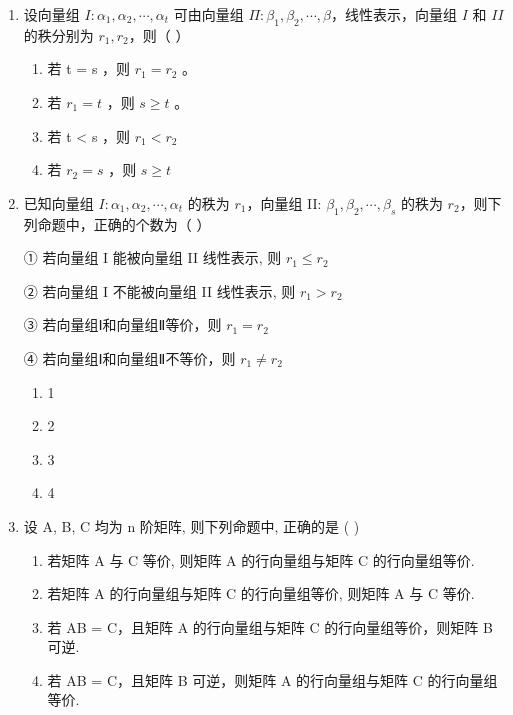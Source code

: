 \documentclass[12pt, a4paper]{ctexart}
\begin{document}
\begin{enumerate}
    \item 设向量组 $ I: \alpha_1, \alpha_2, \cdots, \alpha_t $ 可由向量组 $ \Pi: \beta_1, \beta_2, \cdots, \beta $，线性表示，向量组 $ I $ 和 $ II $ 的秩分别为 $ r_1, r_2 $，则（ \underline{\hspace{1cm}} ）
    \begin{enumerate}[label=(\Alph*)]
        \item 若 t = s ，则 $ r_{1} = r_{2} $ 。
        \item 若 $ r_{1} = t $ ，则 $ s \geq t $ 。
        \item 若 t < s ，则 $ r_{1} < r_{2} $
        \item 若 $ r_{2}=s $ ，则 $ s \geq t $
    \end{enumerate}

    \item 已知向量组 $ I: \alpha_1, \alpha_2, \cdots, \alpha_t $ 的秩为 $ r_1 $，向量组 II: $ \beta_1, \beta_2, \cdots, \beta_s $ 的秩为 $ r_2 $，则下列命题中，正确的个数为（ \underline{\hspace{1cm}} ）
    
    ① 若向量组 I 能被向量组 II 线性表示, 则 $ r_{1} \leq r_{2} $
    
    ② 若向量组 I 不能被向量组 II 线性表示, 则 $ r_{1} > r_{2} $
    
    ③ 若向量组Ⅰ和向量组Ⅱ等价，则 $ r_{1}=r_{2} $
    
    ④ 若向量组Ⅰ和向量组Ⅱ不等价，则 $ r_{1} \neq r_{2} $
    \begin{enumerate}[label=(\Alph*)]
        \item 1
        \item 2
        \item 3
        \item 4
    \end{enumerate}

    \item 设 A, B, C 均为 n 阶矩阵, 则下列命题中, 正确的是 ( \underline{\hspace{1cm}} )
    \begin{enumerate}[label=(\Alph*)]
        \item 若矩阵 A 与 C 等价, 则矩阵 A 的行向量组与矩阵 C 的行向量组等价.
        \item 若矩阵 A 的行向量组与矩阵 C 的行向量组等价, 则矩阵 A 与 C 等价.
        \item 若 AB = C，且矩阵 A 的行向量组与矩阵 C 的行向量组等价，则矩阵 B 可逆.
        \item 若 AB = C，且矩阵 B 可逆，则矩阵 A 的行向量组与矩阵 C 的行向量组等价.
    \end{enumerate}


\end{enumerate}
\end{document}
